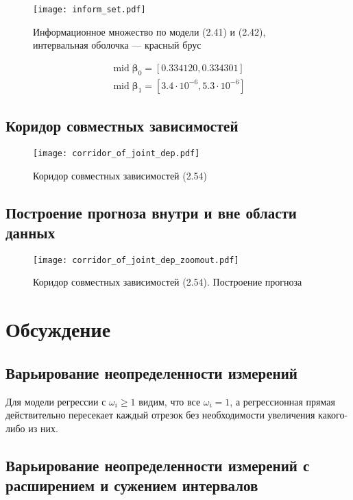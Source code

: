 \documentclass[12pt]{article}
\DeclareMathOperator{\midd}{mid}
\begin{document}
	\begin{figure}[H]
		\centering
		\texttt{[image: inform\_set.pdf]}
		\caption{Информационное множество по модели (2.41) и (2.42), интервальная оболочка — красный брус}
	\end{figure}

	\begin{equation*}
		\begin{gathered}
			\midd \boldsymbol{\beta}_0 = [0.334120, 0.334301]\\
			\midd \boldsymbol{\beta}_1 = [3.4 \cdot 10^{-6}, 5.3 \cdot 10^{-6}]
		\end{gathered}
	\end{equation*}

	\subsection{Коридор совместных зависимостей}
	
	\begin{figure}[H]
		\centering
		\texttt{[image: corridor\_of\_joint\_dep.pdf]}
		\caption{Коридор совместных зависимостей (2.54)}
	\end{figure}
	
	\subsection{Построение прогноза внутри и вне области данных}
	
	\begin{figure}[H]
		\centering
		\texttt{[image: corridor\_of\_joint\_dep\_zoomout.pdf]}
		\caption{Коридор совместных зависимостей (2.54). Построение
			прогноза}
	\end{figure}
	
	\section{Обсуждение}
	
	\subsection{Варьирование неопределенности измерений}
	
	Для модели регрессии с $\omega_i \geq 1$ видим, что все $\omega_i = 1$, а регрессионная прямая действительно пересекает каждый отрезок без необходимости увеличения какого-либо из них.
	
	\subsection{Варьирование неопределенности измерений с расширением и сужением интервалов}
	
\end{document}
